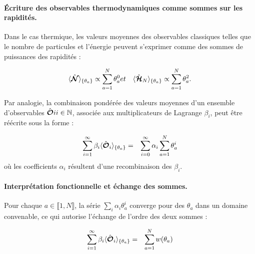\paragraph{Écriture des observables thermodynamiques comme sommes sur les rapidités.}

Dans le cas thermique, les valeurs moyennes des observables classiques telles que le nombre de particules et l'énergie peuvent s'exprimer comme des sommes de puissances des rapidités :

\begin{eqnarray*}
	\langle \hat{\bm{\mathcal{N}}} \rangle_{\{ \theta_a\} } \propto \sum_{a = 1}^N \theta_a^0  & et & \langle \hat{\bm{\mathcal{H}}}_N \rangle_{\{ \theta_a\} } \propto \sum_{a = 1}^N \theta_a^2 .	
\end{eqnarray*}

Par analogie, la combinaison pondérée des valeurs moyennes d’un ensemble d’observables ${ \hat{\bm{\mathcal{O}}}i }{i \in \mathbb{N}}$, associée aux multiplicateurs de Lagrange ${ \beta_i }$, peut être réécrite sous la forme :

\begin{eqnarray}
	\sum_{i = 1}^\infty  \beta_i \langle \hat{\bm{\mathcal{O}}}_i \rangle_{ \{\theta_a \} } & = & \sum_{i = 0}^\infty \alpha_i \sum_{a = 1 }^N \theta_a^i		
\end{eqnarray}
où les coefficients $\alpha_i$ résultent d’une recombinaison des $\beta_i$.

\paragraph{Interprétation fonctionnelle et échange des sommes.}
	
Pour chaque $a \in \llbracket 1, N \rrbracket$, la série $\sum_i \alpha_i \theta_a^i$ converge pour des $\theta_a$ dans un domaine convenable, ce qui autorise l’échange de l’ordre des deux sommes : 
	
\begin{eqnarray}
	\sum_{i = 1}^\infty  \beta_i \langle \hat{\bm{\mathcal{O}}}_i \rangle_{ \{\theta_a \} } & = & \sum_{a = 1 }^N  w(\theta_a) 
\end{eqnarray}
	
